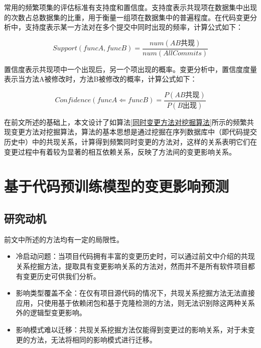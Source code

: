 常用的频繁项集的评估标准有支持度和置信度。支持度表示共现项在数据集中出现的次数占总数据集的比重，用于衡量一组项在数据集中的普遍程度。在代码变更分析中，支持度表示某一方法对在多个提交中同时出现的频率，计算公式如下：

\begin{equation}
\label{1_Support}
Support(funcA,funcB)=\frac{num(AB\text{共现})}{num(AllCommits)}
\end{equation}

置信度表示共现项中一个出现后，另一个项出现的概率。变更分析中，置信度度量表示当方法A被修改时，方法B被修改的概率，计算公式如下：

\begin{equation}
\label{1_Confidence}
Confidence(funcA\Leftarrow funcB)=\frac{P(AB\text{共现})}{P(B\text{出现})}
\end{equation}

在前文所述的基础上，本文设计了如算法\ref{同时变更方法对挖掘算法}所示的频繁共现变更方法对挖掘算法，算法的基本思想是通过挖掘在序列数据库中（即代码提交历史中）中的共现关系，计算得到频繁同时变更的方法对，这样的关系表明它们在变更过程中有着较为显著的相互依赖关系，反映了方法间的变更影响关系。

\section{基于代码预训练模型的变更影响预测}
\subsection{研究动机}

前文中所述的方法均有一定的局限性。

\begin{itemize}

    \item 冷启动问题：当项目代码拥有丰富的变更历史时，可以通过前文中介绍的共现关系挖掘方法，提取具有变更影响关系的方法对，然而并不是所有软件项目都有变更历史可供我们分析。

    \item 影响类型覆盖不全：在仅有项目源代码的情况下，共现关系挖掘方法无法直接应用，只使用基于依赖闭包和基于克隆检测的方法，则无法识别除这两种关系外的逻辑型变更影响。
    
    \item 影响模式难以迁移：共现关系挖掘方法仅能得到变更过的影响关系，对于未变更的方法，无法将相同的影响模式进行迁移。
    
\end{itemize}


